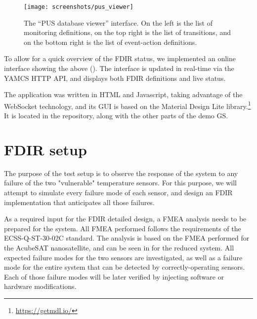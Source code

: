 \documentclass[a4paper,nobib]{tufte-book}
\begin{document}
\begin{figure}[h]
	\texttt{[image: screenshots/pus\_viewer]}
	\caption[The ``PUS database viewer'' interface]{The ``\acs{PUS} database viewer'' interface. On the left is the list of monitoring definitions, on the top right is the list of transitions, and on the bottom right is the list of event-action definitions.}
		\label{fig:pusviewer}
\end{figure}
	
To allow for a quick overview of the \acs{FDIR} status, we implemented an online interface showing the above (). The interface is updated in real-time via the \acs{YAMCS} \acs{HTTP} \acs{API}, and displays both \acs{FDIR} definitions and live status.

The application was written in HTML and Javascript, taking advantage of the WebSocket technology, and its GUI is based on the Material Design Lite library.\footnote[]{\url{https://getmdl.io/}} It is located in the repository, along with the other parts of the demo \acl{GS}.

\section{\ac{FDIR} setup}

The purpose of the test setup is to observe the response of the system to any failure of the two "vulnerable" temperature sensors. For this purpose, we will attempt to simulate every failure mode of each sensor, and design an \ac{FDIR} implementation that anticipates all those failures.

As a required input for the \ac{FDIR} detailed design, a \ac{FMEA} analysis needs to be prepared for the system. All \ac{FMEA} performed follows the requirements of the ECSS-Q-ST-30-02C standard.\autocite{ECSS-Q-ST-30-02C} The analysis is based on the \ac{FMEA} performed for the AcubeSAT nanosatellite,\autocite{retselis_acubesat_fmea_2020} and can be seen in  for the reduced system. All expected failure modes for the two sensors are investigated, as well as a failure mode for the entire system that can be detected by correctly-operating sensors. Each of those failure modes will be later verified by injecting software or hardware modifications.
\end{document}
